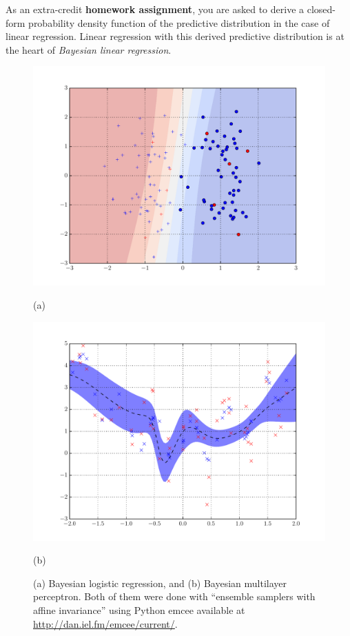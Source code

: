 \documentclass{report}
\begin{document}
As an extra-credit {\bf homework assignment}, you are asked to derive a
closed-form probability density function of the predictive distribution in the
case of linear regression. Linear regression with this derived predictive
distribution is at the heart of {\it Bayesian linear regression}.


\begin{figure}[t]
    \centering
    \begin{minipage}{0.48\textwidth}
        \centering
        \includegraphics[width=\columnwidth,clip=True,trim=50 0 50
        0]{figures/bayes_logreg.pdf}

        (a)
    \end{minipage}
    \hfill
    \begin{minipage}{0.48\textwidth}
        \centering
        \includegraphics[width=\columnwidth,clip=True,trim=50 0 50
        0]{figures/bayes_linreg_mlp.pdf}

        (b)
    \end{minipage}

    \caption{
        \label{fig:bayes_logreg}
        (a) Bayesian logistic regression, and (b) Bayesian multilayer
        perceptron. Both of them were done with ``ensemble samplers with affine
        invariance'' \cite{goodman2010ensemble} using Python emcee available at
        \url{http://dan.iel.fm/emcee/current/}. 
    }
\end{figure}
\end{document}
